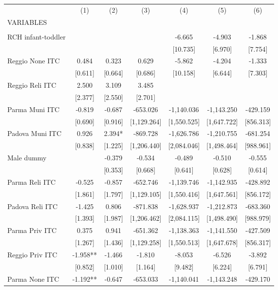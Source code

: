 \begin{tabular}{lcccccc} \hline
 & (1) & (2) & (3) & (4) & (5) & (6) \\
VARIABLES &  &  &  &  &  &  \\ \hline
 &  &  &  &  &  &  \\
RCH infant-toddler &  &  &  & -6.665 & -4.903 & -1.868 \\
 &  &  &  & [10.735] & [6.970] & [7.754] \\
Reggio None ITC & 0.484 & 0.323 & 0.629 & -5.862 & -4.204 & -1.333 \\
 & [0.611] & [0.664] & [0.686] & [10.158] & [6.644] & [7.303] \\
Reggio Reli ITC & 2.500 & 3.109 & 3.485 &  &  &  \\
 & [2.377] & [2.550] & [2.701] &  &  &  \\
Parma Muni ITC & -0.819 & -0.687 & -653.026 & -1,140.036 & -1,143.250 & -429.159 \\
 & [0.690] & [0.916] & [1,129.264] & [1,550.525] & [1,647.722] & [856.313] \\
Padova Muni ITC & 0.926 & 2.394* & -869.728 & -1,626.786 & -1,210.755 & -681.254 \\
 & [0.838] & [1.225] & [1,206.440] & [2,084.046] & [1,498.464] & [988.961] \\
Male dummy &  & -0.379 & -0.534 & -0.489 & -0.510 & -0.555 \\
 &  & [0.353] & [0.668] & [0.641] & [0.628] & [0.614] \\
Parma Reli ITC & -0.525 & -0.857 & -652.746 & -1,139.746 & -1,142.935 & -428.892 \\
 & [1.861] & [1.797] & [1,129.105] & [1,550.416] & [1,647.561] & [856.172] \\
Padova Reli ITC & -1.425 & 0.806 & -871.838 & -1,628.937 & -1,212.873 & -683.360 \\
 & [1.393] & [1.987] & [1,206.462] & [2,084.115] & [1,498.490] & [988.979] \\
Parma Priv ITC & 0.375 & 0.941 & -651.362 & -1,138.363 & -1,141.550 & -427.509 \\
 & [1.267] & [1.436] & [1,129.258] & [1,550.513] & [1,647.678] & [856.317] \\
Reggio Priv ITC & -1.958** & -1.466 & -1.810 & -8.053 & -6.526 & -3.892 \\
 & [0.852] & [1.010] & [1.164] & [9.482] & [6.224] & [6.791] \\
Parma None ITC & -1.192** & -0.647 & -653.033 & -1,140.041 & -1,143.248 & -429.170 \\

\end{tabular}

